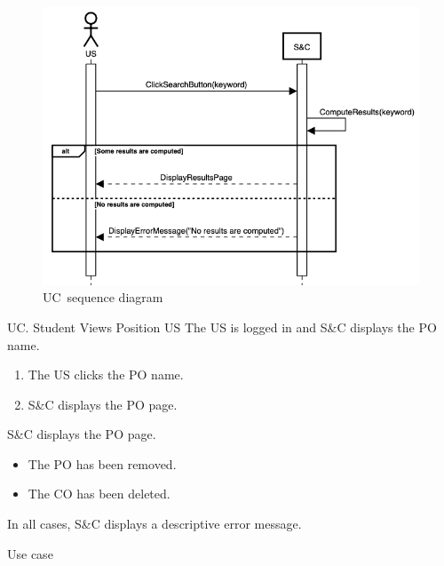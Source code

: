 \begin{figure}[h]
    \centering
    \includegraphics[width=13cm]{images/sequence-diagrams/student-searches-position.png}
    \caption{UC\theuc\ sequence diagram}
\end{figure}


\clearpage
\begin{usecase}
    {UC\theuc. Student Views Position}
    {US}
    {The US is logged in and S\&C displays the PO name.}
    {\begin{enumerate}[leftmargin=*]
        \item The US clicks the PO name.
        \item S\&C displays the PO page.
    \end{enumerate}}
    {S\&C displays the PO page.}
    {\begin{itemize}[leftmargin=*, label=\tiny\textbullet]
        \item The PO has been removed.
        \item The CO has been deleted.
    \end{itemize}
    In all cases, S\&C displays a descriptive error message.}
    {Use case \theuc}
\end{usecase}

